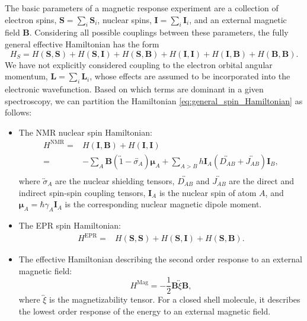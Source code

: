 The basic parameters of a magnetic response experiment are a collection of electron spins, $\bm S = \sum_i \bm S_i$, nuclear spins, $\bm I = \sum_i \bm I_i$, and an external magnetic field $\bm B$. Considering all possible couplings between these parameters, the fully general effective Hamiltonian has the form
\begin{equation}
  \label{eq:general_spin_Hamiltonian}
  H_S = H(\bm S,\bm S) + H(\bm S,\bm I) + H(\bm S,\bm B) + H(\bm I,\bm I) + H(\bm I,\bm B) + H(\bm B,\bm B).
\end{equation}
We have not explicitly considered coupling to the electron orbital angular momentum, $\bm L = \sum_i \bm L_i$, whose effects are assumed to be incorporated into the electronic wavefunction. Based on which terms are dominant in a given spectroscopy, we can partition the Hamiltonian \eqref{eq:general_spin_Hamiltonian} as follows:
\begin{itemize}
\item The NMR nuclear spin Hamiltonian:
  \begin{equation}
    \label{eq:NMR_H}
    \begin{split}
      H^{\text{NMR}} =& H(\bm I,\bm B) + H(\bm I,\bm I) \\
      =& -\sum_A \bm B (\overleftrightarrow 1-\overleftrightarrow{\sigma_A}) \bm\mu_A + \sum_{A>B} h\bm I_A (\overleftrightarrow{D_{AB}}+\overleftrightarrow{J_{AB}}) \bm I_B, \\
    \end{split}
  \end{equation}
  where $\overleftrightarrow{\sigma}_A$ are the nuclear shielding tensors, $\overleftrightarrow{D_{AB}}$ and $\overleftrightarrow{J_{AB}}$ are the direct and indirect spin-spin coupling tensors, $\bm I_A$ is the nuclear spin of atom $A$, and $\bm\mu_A=\hbar\gamma_A\bm I_A$ is the corresponding nuclear magnetic dipole moment.
\item The EPR spin Hamiltonian:
  \begin{equation}
    \label{eq:EPR_H}
    \begin{split}
      H^{\text{EPR}} =& H(\bm S,\bm S) + H(\bm S,\bm I) + H(\bm S,\bm B).
    \end{split}
  \end{equation}
\item The effective Hamiltonian describing the second order response to an external magnetic field:
  \begin{equation}
    \label{eq:chi_H}
    H^{\text{Mag}} = -\frac{1}{2} \bm B \overleftrightarrow\xi \bm B,
  \end{equation}
  where $\overleftrightarrow\xi$ is the magnetizability tensor. For a closed shell molecule, it describes the lowest order response of the energy to an external magnetic field.
\end{itemize}

